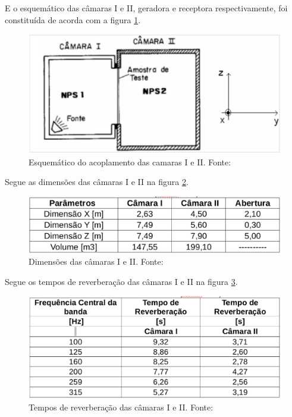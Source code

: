 E o esquemático das câmaras I e II, geradora e receptora respectivamente, foi constituída de acorda com a figura \ref{experimento_1}.

\begin{figure}[h]
	\centering
	\includegraphics[scale=0.32]{imagem_3.eps}
	\caption{Esquemático do acoplamento das camaras I e II. Fonte: \cite{silva2009simulaccao}}
	\label{experimento_1}
\end{figure}

\newpage
Segue as dimensões das câmaras I e II na figura \ref{experimento_2}.

\begin{figure}[h]
	\centering
	\includegraphics[scale=0.35]{imagem_4.eps}
	\caption{Dimensões das câmaras I e II. Fonte: \cite{silva2009simulaccao}}
	\label{experimento_2}
\end{figure}

Segue os tempos de reverberação das câmaras I e II na figura \ref{experimento_3}.
\begin{figure}[h]
	\centering
	\includegraphics[scale=0.35]{imagem_5.eps}
	\caption{Tempos de reverberação das câmaras I e II. Fonte: \cite{silva2009simulaccao}}
	\label{experimento_3}
\end{figure}

